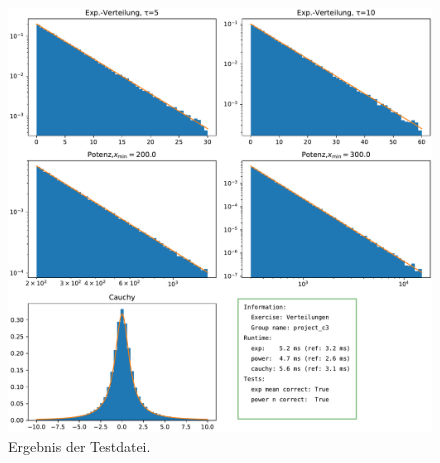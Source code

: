 \documentclass[11pt,a4paper]{article}
\begin{document}
	\begin{figure}[h]
		\centering
		\includegraphics[width=\textwidth]{distributions.pdf}
		\caption{Ergebnis der Testdatei.}
	\end{figure}
\end{document}
